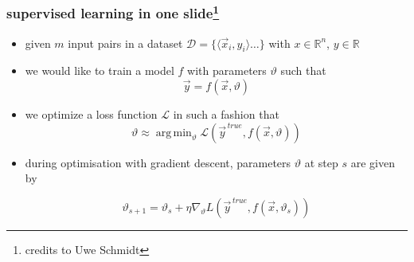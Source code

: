 \documentclass[
  aspectratio=1610, %
  intlimits %
]{beamer}
\DeclareMathOperator*{\argmin}{arg\,min}
\begin{document}
\begin{frame}
  \frametitle{supervised learning in one slide\footnote{credits to Uwe Schmidt}}
  \vfill
  \begin{exampleblock}{}
   \begin{itemize}
   \item given $m$ input pairs in a dataset $\mathcal{D} = \{\langle \vec{x}_i, y_i\rangle \dots \}$ with $x \in \mathbb{R}^n$, $y \in \mathbb{R}$
   \item we would like to train a model $f$ with parameters $\vartheta$ such that 
     \begin{equation*}
     \vec{y} = f(\vec{x}, \vartheta)
   \end{equation*}
   \item we optimize a loss function $\mathcal{L}$ in such a fashion that 
     \begin{equation*}
     \vartheta \approx \argmin_{\vartheta} \mathcal{L}( \vec{y}^{\,true}, f(\vec{x}, \vartheta) )
   \end{equation*}
   \item during optimisation with gradient descent, parameters $\vartheta$ at step $s$ are given by
     
     \begin{equation*}
\vartheta_{s+1} = \vartheta_{s} + \eta \nabla_{\vartheta}L( \vec{y}^{\,true}, f(\vec{x}, \vartheta_{s}))
\end{equation*}

   \end{itemize}
 \end{exampleblock}
  \vfill
  
\end{frame}
\end{document}
